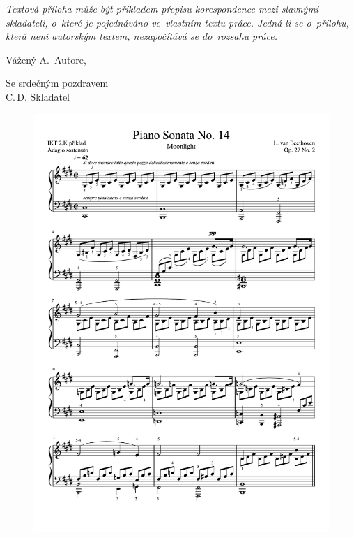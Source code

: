 \clearpage
\begin{appendices}



\textit{
Textová příloha může být příkladem přepisu korespondence mezi slavnými
skladateli, o~které je pojednáváno ve~vlastním textu práce. Jedná-li se
o~přílohu, která není autorským textem, nezapočítává se do~rozsahu práce.
}

\noindent
Vážený A.~Autore,

\lipsum[35-45][12-22]

\begin{flushright}
Se srdečným pozdravem \\
C.\,D. Skladatel
\end{flushright}


\label{priloha:partitura}

\begin{figure}[!ht]
	\begin{center}
		\includegraphics[width=\textwidth]{./obrazky/partitura-priklad.pdf}
    \end{center}
\end{figure}


\end{appendices}
